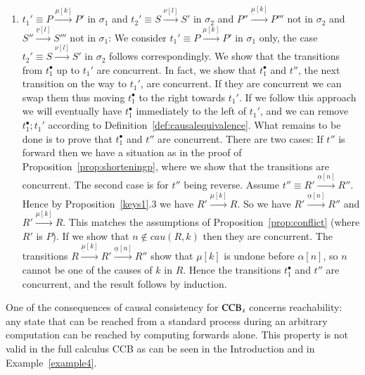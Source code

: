 \begin{pf}
\begin{enumerate}
\begin{enumerate}
\item $t_1' \equiv P \xrightarrow{\mu[k]} P'$ in $\sigma_1$ and $t_2' \equiv S \xrightarrow{\nu[l]} S'$ in $\sigma_2$ and $P'' \xrightarrow{\underline{\mu}[k]} P'''$ not in $\sigma_2$ and $S'' \xrightarrow{\underline{\nu}[l]} S'''$ not in $\sigma_1$: We consider $t_1' \equiv P \xrightarrow{\mu[k]} P'$ in $\sigma_1$
only, the case $t_2' \equiv S \xrightarrow{\nu[l]} S'$ in $\sigma_2$ follows correspondingly. 
We show that the transitions from $t_1^\bullet$ up to $t_1'$ are concurrent. In fact, we show that 
$t_1^\bullet$ and $t''$, the next transition on the way to $t_1'$, are concurrent. If they are concurrent 
we can swap them thus moving $t_1^\bullet$ to the right towards $t_1'$. 
If we follow this approach we will eventually have $t_1^\bullet$ immediately to the left of $t_1'$,
and we can remove $t_1^\bullet;t_1'$ according to Definition~\ref{def:causalequivalence}.
What remains to be done is to prove that $t_1^\bullet$ and $t''$ are concurrent. There are two cases: 
If $t''$ is forward then we have a situation as in the proof of Proposition~\ref{prop:shorteningp}, 
where we show that the transitions are concurrent. The second case is for $t''$ being reverse. 
Assume $t'' \equiv R' \xrightarrow{\underline{\alpha}[n]} R''$. Hence by Proposition~\ref{keys1}.3 
we have $R' \xrightarrow{\mu[k]} R$. So we have $R' \xrightarrow{\underline{\alpha}[n]} R''$ and $R' \xrightarrow{\mu[k]} R$. This matches the assumptions of Proposition~\ref{prop:conflict} (where $R'$ is $P$). If we show that $n \notin cau(R,k)$ then they are concurrent. The transitions $R \xrightarrow{\underline{\mu}[k]} R' \xrightarrow{\underline{\alpha}[n]} R''$ 
show that $\mu[k]$ is undone before $\alpha[n]$, so $n$ cannot be one of the causes of $k$ in $R$.
Hence the transitions $t_1^\bullet$ and $t''$ are concurrent, and the result follows by induction.
\end{enumerate}

\end{enumerate}
\end{pf}
One of the consequences of causal consistency for ${\rm CCB}_s$ concerns reachability: 
any state that can be reached from a standard process during an arbitrary computation can be reached 
by computing forwards alone. This property is not valid in the full calculus CCB as can be seen in
the Introduction and in Example~\ref{example4}. 

